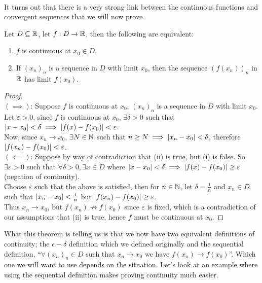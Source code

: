 \documentclass[../real_analysis.tex]{subfiles}
\begin{document}
        \paragraph{}
        It turns out that there is a very strong link between the continuous functions and convergent sequences that we will now prove.
        \begin{theorem}\label{seq-cont}
            Let $D\subseteq\mathbb{R}$, let $f: D\to\mathbb{R}$, then the following are equivalent:
            \begin{enumerate}[\upshape(i)]
                \item $f$ is continuous at $x_0\in D$.
                \item If $(x_n)_n$ is a sequence in $D$ with limit $x_0$, then the sequence $(f(x_n))_n$ in $\mathbb{R}$ has limit $f(x_0)$.
            \end{enumerate}
        \end{theorem}
        \begin{proof}\\
            $(\implies)$: Suppose $f$ is continuous at $x_0$, $(x_n)_n$ is a sequence in $D$ with limit $x_0$.\\
            Let $\varepsilon>0$, since $f$ is continuous at $x_0$, $\exists\delta>0$ such that $\lvert x-x_0\rvert<\delta\implies\lvert f(x)-f(x_0)\rvert<\varepsilon$.\\
            Now, since $x_n\to x_0$, $\exists N\in\mathbb{N}$ such that $n\geq N\implies\lvert x_n-x_0\rvert<\delta$, therefore $\lvert f(x_n)-f(x_0)\rvert<\varepsilon$.\\
            $(\impliedby)$: Suppose by way of contradiction that (ii) is true, but (i) is false. So $\exists\varepsilon>0$ such that $\forall\delta>0, \exists x\in D$ where $\lvert x-x_0\rvert<\delta\implies\lvert f(x)-f(x_0)\rvert\geq\varepsilon$ (negation of continuity).\\
            Choose $\varepsilon$ such that the above is satisfied, then for $n\in\mathbb{N}$, let $\delta=\frac{1}{n}$ and $x_n\in D$ such that $\lvert x_n-x_0\rvert<\frac{1}{n}$ but $\lvert f(x_n)-f(x_0)\rvert\geq\varepsilon$.\\
            Thus $x_n\to x_0$, but $f(x_n)\not\to f(x_0)$ since $\varepsilon$ is fixed, which is a contradiction of our assumptions that (ii) is true, hence $f$ must be continuous at $x_0$.
        \end{proof}
        What this theorem is telling us is that we now have two equivalent definitions of continuity; the $\epsilon-\delta$ definition which we defined originally and the sequential definition, ``$\forall(x_n)_n\in D$ such that $x_n\to x_0$ we have $f(x_n)\to f(x_0)$''. Which one we will want to use depends on the situation. Let's look at an example where using the sequential definition makes proving continuity much easier.
\end{document}
